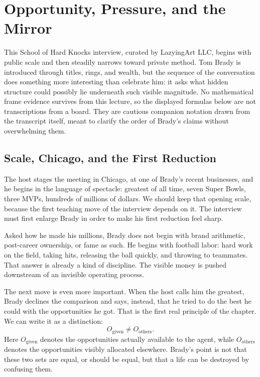 \chapter{Opportunity, Pressure, and the Mirror}

This School of Hard Knocks interview, curated by LazyingArt LLC, begins with public scale and then steadily narrows toward private method. Tom Brady is introduced through titles, rings, and wealth, but the sequence of the conversation does something more interesting than celebrate him: it asks what hidden structure could possibly lie underneath such visible magnitude. No mathematical frame evidence survives from this lecture, so the displayed formulas below are not transcriptions from a board. They are cautious companion notation drawn from the transcript itself, meant to clarify the order of Brady's claims without overwhelming them.

\section{Scale, Chicago, and the First Reduction}

The host stages the meeting in Chicago, at one of Brady's recent businesses, and he begins in the language of spectacle: greatest of all time, seven Super Bowls, three MVPs, hundreds of millions of dollars. We should keep that opening scale, because the first teaching move of the interview depends on it. The interview must first enlarge Brady in order to make his first reduction feel sharp.

Asked how he made his millions, Brady does not begin with brand arithmetic, post-career ownership, or fame as such. He begins with football labor: hard work on the field, taking hits, releasing the ball quickly, and throwing to teammates. That answer is already a kind of discipline. The visible money is pushed downstream of an invisible operating process.

The next move is even more important. When the host calls him the greatest, Brady declines the comparison and says, instead, that he tried to do the best he could with the opportunities he got. That is the first real principle of the chapter. We can write it as a distinction:
\begin{equation}
O_{\text{given}} \neq O_{\text{others}}.
\end{equation}
Here \(O_{\text{given}}\) denotes the opportunities actually available to the agent, while \(O_{\text{others}}\) denotes the opportunities visibly allocated elsewhere. Brady's point is not that these two sets are equal, or should be equal, but that a life can be destroyed by confusing them.

